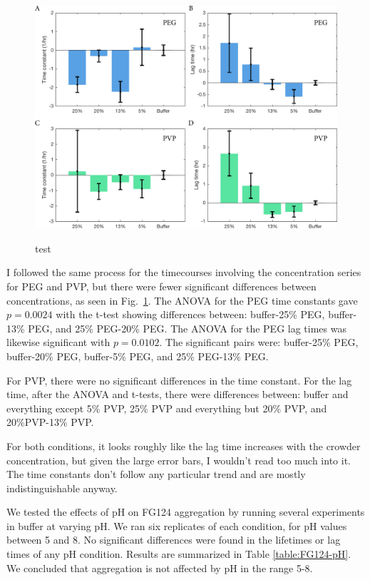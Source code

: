 \begin{figure}
\caption{test}
\centering
\includegraphics[width=\textwidth]{figs/ch05/peg-and-pvp-charts}
\label{fig:peg-pvp}
\end{figure}

I followed the same process for the timecourses involving the concentration series for PEG and PVP, but there were fewer significant differences between concentrations, as seen in Fig.~\ref{fig:peg-pvp}.  The ANOVA for the PEG time constants gave $p=0.0024$ with the t-test showing differences between: buffer-25\% PEG, buffer-13\% PEG, and 25\% PEG-20\% PEG. The ANOVA for the PEG lag times was likewise significant with $p = 0.0102$.  The significant pairs were: buffer-25\% PEG, buffer-20\% PEG, buffer-5\% PEG, and 25\% PEG-13\% PEG.

For PVP, there were no significant differences in the time constant.  For the lag time, after the ANOVA and t-tests, there were differences between: buffer and everything except 5\% PVP, 25\% PVP and everything but 20\% PVP, and 20\%PVP-13\% PVP.

For both conditions, it looks roughly like the lag time increases with the crowder concentration, but given the large error bars, I wouldn't read too much into it.  The time constants don't follow any particular trend and are mostly indistinguishable anyway.

We tested the effects of pH on FG124 aggregation by running several experiments in buffer at varying pH.  We ran six replicates of each condition, for pH values between 5 and 8.  No significant differences were found in the lifetimes or lag times of any pH condition.  Results are summarized in Table \ref{table:FG124-pH}. We concluded that aggregation is not affected by pH in the range 5-8.

